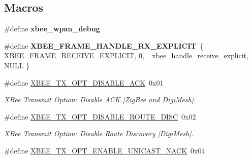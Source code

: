 \subsection*{Macros}
\begin{DoxyCompactItemize}
\item 
\hypertarget{group__xbee__wpan_gaca7a1f4a9ddf33e00ce7fd9382e18d29}{\#define {\bfseries xbee\-\_\-wpan\-\_\-debug}}\label{group__xbee__wpan_gaca7a1f4a9ddf33e00ce7fd9382e18d29}

\item 
\hypertarget{group__xbee__wpan_ga8ac9b01d771126ea2e391a12a0a996ee}{\#define {\bfseries X\-B\-E\-E\-\_\-\-F\-R\-A\-M\-E\-\_\-\-H\-A\-N\-D\-L\-E\-\_\-\-R\-X\-\_\-\-E\-X\-P\-L\-I\-C\-I\-T}~\{ \hyperlink{group__xbee__device_gga7753bbebaf00d6d64942f64b6ae9b7b9a8f80b5fa338b8bf34888ffcbfd260a54}{X\-B\-E\-E\-\_\-\-F\-R\-A\-M\-E\-\_\-\-R\-E\-C\-E\-I\-V\-E\-\_\-\-E\-X\-P\-L\-I\-C\-I\-T}, 0, \hyperlink{group__xbee__wpan_ga8cb1973677412a2c5627a77009a8f283}{\-\_\-xbee\-\_\-handle\-\_\-receive\-\_\-explicit}, N\-U\-L\-L \}}\label{group__xbee__wpan_ga8ac9b01d771126ea2e391a12a0a996ee}

\item 
\hypertarget{group__xbee__wpan_ga4f363736032969f338cfd4e335e9be50}{\#define \hyperlink{group__xbee__wpan_ga4f363736032969f338cfd4e335e9be50}{X\-B\-E\-E\-\_\-\-T\-X\-\_\-\-O\-P\-T\-\_\-\-D\-I\-S\-A\-B\-L\-E\-\_\-\-A\-C\-K}~0x01}\label{group__xbee__wpan_ga4f363736032969f338cfd4e335e9be50}

\begin{DoxyCompactList}\small\item\em X\-Bee Transmit Option\-: Disable A\-C\-K \mbox{[}Zig\-Bee and Digi\-Mesh\mbox{]}. \end{DoxyCompactList}\item 
\hypertarget{group__xbee__wpan_ga6a2846b0ca6b15ad7bdd7e4503fe5c30}{\#define \hyperlink{group__xbee__wpan_ga6a2846b0ca6b15ad7bdd7e4503fe5c30}{X\-B\-E\-E\-\_\-\-T\-X\-\_\-\-O\-P\-T\-\_\-\-D\-I\-S\-A\-B\-L\-E\-\_\-\-R\-O\-U\-T\-E\-\_\-\-D\-I\-S\-C}~0x02}\label{group__xbee__wpan_ga6a2846b0ca6b15ad7bdd7e4503fe5c30}

\begin{DoxyCompactList}\small\item\em X\-Bee Transmit Option\-: Disable Route Discovery \mbox{[}Digi\-Mesh\mbox{]}. \end{DoxyCompactList}\item 
\hypertarget{group__xbee__wpan_ga8e8ed1a92da23af9d12c15a72a37795c}{\#define \hyperlink{group__xbee__wpan_ga8e8ed1a92da23af9d12c15a72a37795c}{X\-B\-E\-E\-\_\-\-T\-X\-\_\-\-O\-P\-T\-\_\-\-E\-N\-A\-B\-L\-E\-\_\-\-U\-N\-I\-C\-A\-S\-T\-\_\-\-N\-A\-C\-K}~0x04}\label{group__xbee__wpan_ga8e8ed1a92da23af9d12c15a72a37795c}


\end{DoxyCompactItemize}
